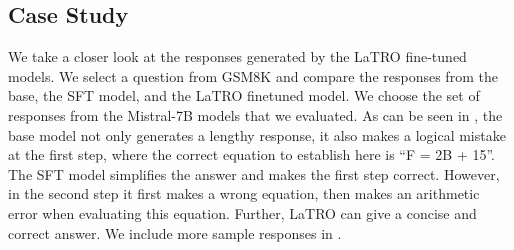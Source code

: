 \subsection{Case Study}
\label{sec:analysis}
 We take a closer look at the responses generated by the LaTRO fine-tuned models. 
 We select a question from GSM8K and compare the responses from the base, the SFT model, and the LaTRO finetuned model. 
 We choose the set of responses from the Mistral-7B models that we evaluated. As can be seen in , the base model not only generates a lengthy response, it also makes a logical mistake at the first step, where the correct equation to establish here is ``F = 2B + 15''. The SFT model simplifies the answer and makes the first step correct. However, in the second step it first makes a wrong equation, then makes an arithmetic error when evaluating this equation. Further, LaTRO can give a concise and correct answer. We include more sample responses in .
